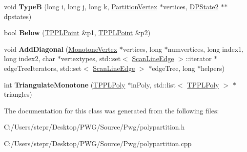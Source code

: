 \begin{DoxyCompactItemize}
\mbox{\label{class_t_p_p_l_partition_a92a3a16d31ed3e41e8ae8175c7a70f0a}} 
void {\bfseries TypeB} (long i, long j, long k, \mbox{\hyperlink{struct_t_p_p_l_partition_1_1_partition_vertex}{Partition\+Vertex}} $\ast$vertices, \mbox{\hyperlink{struct_t_p_p_l_partition_1_1_d_p_state2}{D\+P\+State2}} $\ast$$\ast$dpstates)
\item 
\mbox{\label{class_t_p_p_l_partition_a849cd2a2551e88a13974eb4a389c6487}} 
bool {\bfseries Below} (\mbox{\hyperlink{struct_t_p_p_l_point}{T\+P\+P\+L\+Point}} \&p1, \mbox{\hyperlink{struct_t_p_p_l_point}{T\+P\+P\+L\+Point}} \&p2)
\item 
\mbox{\label{class_t_p_p_l_partition_a596b63188c3e90f787e9d21bde10b5f1}} 
void {\bfseries Add\+Diagonal} (\mbox{\hyperlink{struct_t_p_p_l_partition_1_1_monotone_vertex}{Monotone\+Vertex}} $\ast$vertices, long $\ast$numvertices, long index1, long index2, char $\ast$vertextypes, std\+::set$<$ \mbox{\hyperlink{struct_t_p_p_l_partition_1_1_scan_line_edge}{Scan\+Line\+Edge}} $>$\+::iterator $\ast$edge\+Tree\+Iterators, std\+::set$<$ \mbox{\hyperlink{struct_t_p_p_l_partition_1_1_scan_line_edge}{Scan\+Line\+Edge}} $>$ $\ast$edge\+Tree, long $\ast$helpers)
\item 
\mbox{\label{class_t_p_p_l_partition_ad9ccb8c8fb4d216e4e2e2260370ebcaa}} 
int {\bfseries Triangulate\+Monotone} (\mbox{\hyperlink{class_t_p_p_l_poly}{T\+P\+P\+L\+Poly}} $\ast$in\+Poly, std\+::list$<$ \mbox{\hyperlink{class_t_p_p_l_poly}{T\+P\+P\+L\+Poly}} $>$ $\ast$triangles)
\end{DoxyCompactItemize}


The documentation for this class was generated from the following files\+:\begin{DoxyCompactItemize}
\item 
C\+:/\+Users/stepr/\+Desktop/\+P\+W\+G/\+Source/\+Pwg/polypartition.\+h\item 
C\+:/\+Users/stepr/\+Desktop/\+P\+W\+G/\+Source/\+Pwg/polypartition.\+cpp\end{DoxyCompactItemize}
